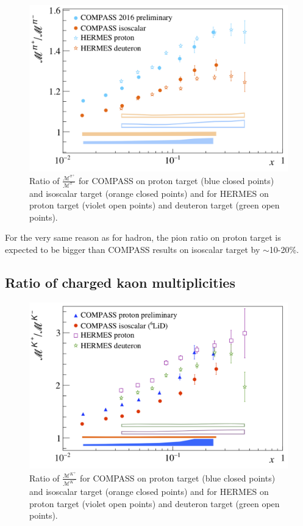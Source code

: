 \begin{figure}[!h]
  \centering
	\includegraphics[scale=0.5]{./gfx/pir.png}
	\caption{Ratio of $\frac{\mathscr{M}^{\pi^+}}{\mathscr{M}^{\pi^-}}$ for COMPASS on proton target (blue closed points) and isoscalar target (orange closed points) and for HERMES on proton target (violet open points) and deuteron target (green open points).}
	\label{pic:piratio}
\end{figure}

For the very same reason as for hadron, the pion ratio on proton target is expected to be bigger than COMPASS results on isoscalar target by $\sim$10-20\%.

\subsection{Ratio of charged kaon multiplicities}

\begin{figure}[!h]
  \centering
	\includegraphics[scale=0.5]{./gfx/Kr.png}
	\caption{Ratio of $\frac{\mathscr{M}^{K^+}}{\mathscr{M}^{K^-}}$ for COMPASS on proton target (blue closed points) and isoscalar target (orange closed points) and for HERMES on proton target (violet open points) and deuteron target (green open points).}
	\label{pic:kratio}
\end{figure}

